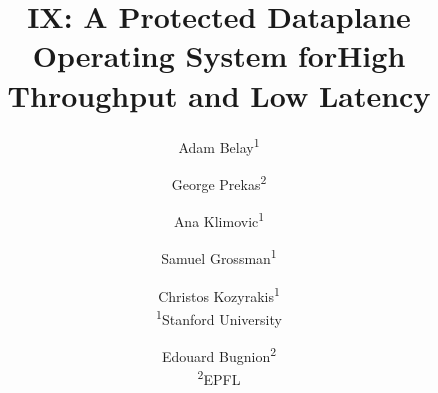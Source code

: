 \documentclass[10pt,twocolumn]{article}
\begin{document}
\title{\bf IX: A Protected Dataplane Operating System for\break High Throughput and Low Latency}


\author{Adam Belay\textsuperscript{1} \and 
  George Prekas\textsuperscript{2} \and 
  Ana Klimovic\textsuperscript{1} \and 
  Samuel Grossman\textsuperscript{1} \and
  Christos Kozyrakis\textsuperscript{1}\vspace*{5pt}\\\textsuperscript{1}Stanford
  University \and
  Edouard Bugnion\textsuperscript{2}\vspace*{5pt}\\\textsuperscript{2}EPFL}

 

\date{}
\maketitle


\pagestyle{empty}

\thispagestyle{fancy}













{\frenchspacing

}
\end{document}
